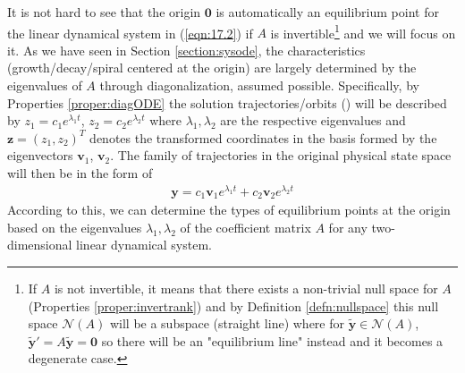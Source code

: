 It is not hard to see that the origin $\textbf{0}$ is automatically an equilibrium point for the linear dynamical system in (\ref{eqn:17.2}) if $A$ is invertible\footnote{If $A$ is not invertible, it means that there exists a non-trivial null space for $A$ (Properties \ref{proper:invertrank}) and by Definition \ref{defn:nullspace} this null space $\mathcal{N}(A)$ will be a subspace (straight line) where for $\tilde{\textbf{y}} \in \mathcal{N}(A)$, $\tilde{\textbf{y}}' = A\tilde{\textbf{y}} = \textbf{0}$ so there will be an "equilibrium line" instead and it becomes a degenerate case.} and we will focus on it. As we have seen in Section \ref{section:sysode}, the characteristics (growth/decay/spiral centered at the origin) are largely determined by the eigenvalues of $A$ through diagonalization, assumed possible. Specifically, by Properties \ref{proper:diagODE} the solution trajectories/orbits () will be described by $z_1 = c_1e^{\lambda_1 t}$, $z_2 = c_2e^{\lambda_2 t}$ where $\lambda_1, \lambda_2$ are the respective eigenvalues and $\textbf{z} = (z_1, z_2)^T$ denotes the transformed coordinates in the basis formed by the eigenvectors $\textbf{v}_1$, $\textbf{v}_2$. The family of trajectories in the original physical state space will then be in the form of
\begin{align}
\textbf{y} = c_1\textbf{v}_1e^{\lambda_1 t} + c_2\textbf{v}_2e^{\lambda_2 t} \label{eqn:eigendyn2d}
\end{align}
According to this, we can determine the types of equilibrium points at the origin based on the eigenvalues $\lambda_1, \lambda_2$ of the coefficient matrix $A$ for any two-dimensional linear dynamical system.
